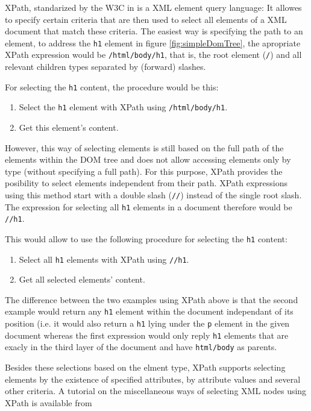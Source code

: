 XPath, standarized by the W3C in \cite{W3XPDef} is a XML element query language: It allowes to specify certain criteria that are then used to select all elements of a XML document that match these criteria. The easiest way is specifying the path to an element, to address the \texttt{h1} element in figure \ref{fig:simpleDomTree}, the apropriate XPath expression would be \verb|/html/body/h1|, that is, the root element (\verb-/-) and all relevant children types separated by (forward) slashes.

For selecting the \texttt{h1} content, the procedure would be this:

\begin{enumerate}
	\item Select the \texttt{h1} element with XPath using \verb|/html/body/h1|.
	\item Get this element's content.
\end{enumerate}

However, this way of selecting elements is still based on the full path of the elements within the DOM tree and does not allow accessing elements only by type (without specifying a full path). For this purpose, XPath provides the posibility to select elements independent from their path. XPath expressions using this method start with a double slash (\verb|//|) instead of the single root slash. The expression for selecting all \texttt{h1} elements in a document therefore would be \verb|//h1|.

This would allow to use the following procedure for selecting the \texttt{h1} content:

\begin{enumerate}
	\item Select all \texttt{h1} elements with XPath using \verb|//h1|.
	\item Get all selected elements' content.
\end{enumerate}

The difference between the two examples using XPath above is that the second example would return any \texttt{h1} element within the document independant of its position (i.e. it would also return a \texttt{h1} lying under the \texttt{p} element in the given document whereas the first expression would only reply \texttt{h1} elements that are exacly in the third layer of the document and have \texttt{html/body} as parents.

Besides these selections based on the elment type, XPath supports selecting elements by the existence of specified attributes, by attribute values and several other criteria. A tutorial on the miscellaneous ways of selecting XML nodes using XPath is available from \cite{w3xptut} %